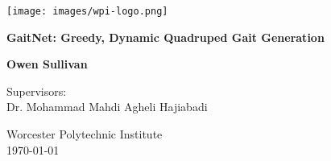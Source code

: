 \documentclass{report}
\begin{document}
\begin{titlepage}
  \centering
  \vspace*{1cm}

  \texttt{[image: images/wpi-logo.png]}\par\vspace{1cm}

  \Huge
  \textbf{GaitNet: Greedy, Dynamic Quadruped Gait Generation}

  \vspace{0.5cm}
  \LARGE

  \vspace{1.5cm}

  \textbf{Owen Sullivan}

  \vfill

  \Large
  Supervisors: \\
  Dr. Mohammad Mahdi Agheli Hajiabadi

  \vspace{0.8cm}

  \Large
  Worcester Polytechnic Institute \\
  {\small \today}

\end{titlepage}

\newpage
{}
\setcounter{page}{1}

\newpage
\tableofcontents
\newpage
\listoffigures
\newpage
\listoftables
\newpage

\newpage


\newpage
\setcounter{page}{1}

\newpage


\newpage


\newpage


\newpage


\newpage



\renewcommand{\bibname}{References}


\end{document}
